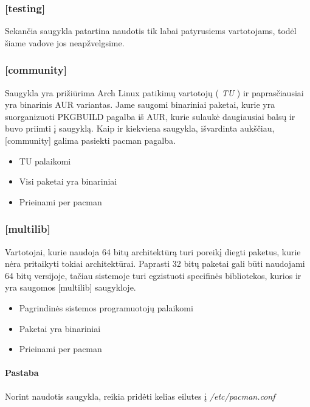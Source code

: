       \subsubsection{[testing]}

        Sekančia saugykla patartina naudotis tik labai patyrusiems
        vartotojams, todėl šiame vadove jos neapžvelgsime.
      
      \subsubsection{[community]}

        Saugykla yra prižiūrima Arch Linux patikimų vartotojų (
        \textsl{TU} ) ir paprasčiausiai yra binarinis AUR
        variantas. Jame saugomi binariniai paketai, kurie yra
        suorganizuoti PKGBUILD pagalba iš AUR, kurie sulaukė
        daugiausiai balsų ir buvo priimti į saugyklą. Kaip ir
        kiekviena saugykla, išvardinta aukščiau, [community] galima
        pasiekti pacman pagalba.

        \begin{itemize}
          \item TU palaikomi
          \item Visi paketai yra binariniai
          \item Prieinami per pacman
        \end{itemize}
      
      \subsubsection{[multilib]}

        Vartotojai, kurie naudoja 64 bitų architektūrą turi poreikį
        diegti paketus, kurie nėra pritaikyti tokiai
        architektūrai. Paprasti 32 bitų paketai gali būti naudojami 64
        bitų versijoje, tačiau sistemoje turi egzistuoti specifinės
        bibliotekos, kurios ir yra saugomos [multilib] saugykloje. 

        \begin{itemize}
          \item Pagrindinės sistemos programuotojų palaikomi
          \item Paketai yra binariniai
          \item Prieinami per pacman
        \end{itemize}

        \paragraph{Pastaba} Norint naudotis saugykla, reikia pridėti
        kelias eilutes į \textsl{/etc/pacman.conf}


